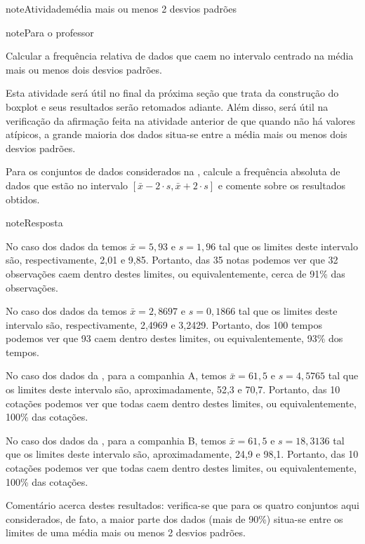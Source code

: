 \label{\detokenize{PE104-5:ativ-mediamaisoumenosdoisdesvios}}
\begin{sphinxadmonition}{note}{Atividade}{média mais ou menos 2 desvios padrões}

\begin{sphinxadmonition}{note}{Para o professor}

 Calcular a frequência relativa de dados que caem no intervalo centrado na média mais ou menos dois desvios padrões.

 Esta atividade será útil no final da próxima seção que trata da construção do boxplot e seus resultados serão retomados adiante. Além disso, será útil na verificação da afirmação feita na atividade anterior de que quando não há valores atípicos, a grande maioria dos dados situa-se entre a média mais ou menos dois desvios padrões.
\end{sphinxadmonition}

Para os conjuntos de dados considerados na , calcule a frequência absoluta de dados que estão no intervalo \([\bar{x}-2\cdot s,\bar{x}+2\cdot s]\) e comente sobre os resultados obtidos.
\end{sphinxadmonition}

\begin{sphinxadmonition}{note}{Resposta}

No caso dos dados da  temos \(\bar{x}=5,93\) e \(s=1,96\) tal que os limites deste intervalo são, respectivamente, 2,01 e 9,85. Portanto, das 35 notas podemos ver que 32 observações caem dentro destes limites, ou equivalentemente,  cerca de 91\% das observações.

No caso dos dados da  temos \(\bar{x}=2,8697\) e \(s=0,1866\) tal que os limites deste intervalo são, respectivamente, 2,4969 e 3,2429. Portanto, dos 100 tempos podemos ver que 93 caem dentro destes limites, ou equivalentemente,  93\% dos tempos.

No caso dos dados da , para a companhia A, temos \(\bar{x}=61,5\) e \(s=4,5765\) tal que os limites deste intervalo são, aproximadamente, 52,3 e 70,7. Portanto, das 10 cotações podemos ver que todas caem dentro destes limites, ou equivalentemente,  100\% das cotações.

No caso dos dados da , para a companhia B, temos \(\bar{x}=61,5\) e \(s=18,3136\) tal que os limites deste intervalo são, aproximadamente,  24,9 e 98,1. Portanto, das 10 cotações podemos ver que todas caem dentro destes limites, ou equivalentemente,  100\% das cotações.

Comentário acerca destes resultados: verifica-se que para os quatro conjuntos aqui considerados, de fato, a maior parte dos dados (mais de 90\%) situa-se entre os limites de uma média mais ou menos 2 desvios padrões.
\label{\detokenize{PE104-5:ativ-comparacao-dois-tipos-de-bonificacao}}\end{sphinxadmonition}

